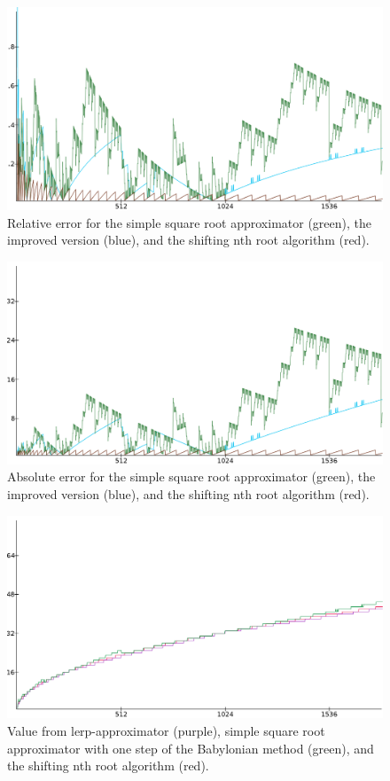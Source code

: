 		\begin{figure}[H]
			\centering
			\includegraphics[width=0.75\linewidth]{figure/rel_error_480x.png} 
			\caption{Relative error for the simple square root approximator
				(green), the improved version (blue), and the shifting nth root
				algorithm (red).}
			\label{orsqrt2}
		\end{figure}

		\begin{figure}[H]
			\centering
			\includegraphics[width=0.75\linewidth]{figure/abs_error_24x.png} 
			\caption{Absolute error for the simple square root approximator
				(green), the improved version (blue), and the shifting nth root
				algorithm (red).}
			\label{orsqrt2}
		\end{figure}

		\begin{figure}[H]
			\centering
			\includegraphics[width=0.75\linewidth]{figure/value_lin12x.png} 
			\caption{Value from lerp-approximator (purple), simple square root
				approximator with one step of the Babylonian method (green),
				and the shifting nth root algorithm (red).}
			\label{orsqrt2}
		\end{figure}

